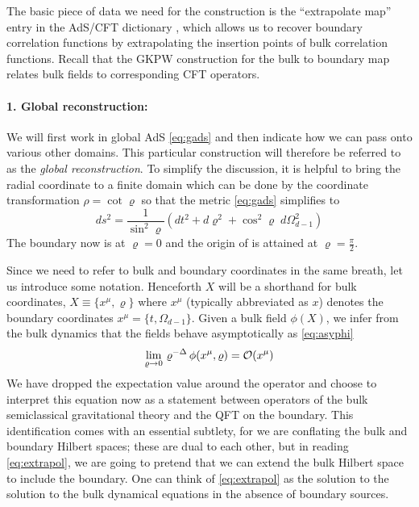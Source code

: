 \documentclass[12pt,openany]{book}
\begin{document}
The basic piece of data we need for the construction is the ``extrapolate map'' entry in the AdS/CFT dictionary \cite{Banks:1998dd,Balasubramanian:1998de,Harlow:2011ke}, which allows us to recover boundary correlation functions by extrapolating the insertion points of bulk correlation functions. Recall that the GKPW construction \cite{Gubser:1998bc,Witten:1998qj} for the bulk to boundary map relates bulk fields to corresponding CFT operators.


\paragraph{1. Global reconstruction:} We will first work in global AdS \eqref{eq:gads} and then indicate how we can pass onto various other domains. This particular construction will therefore be referred to as the \emph{global reconstruction}.  To simplify the discussion, it is helpful to bring the radial coordinate to a finite domain which can be done by the coordinate transformation $\rho = \cot\varrho$ so that the metric \eqref{eq:gads} simplifies to
%
\begin{equation}
ds^2 = \frac{1}{\sin^2 \varrho} \left(dt^2 + d\varrho^2 + \cos^2 \varrho \; d\Omega_{d-1}^2 \right)
\label{eq:gads2}
\end{equation}
%
The boundary now is at $\varrho = 0$ and the origin of  is attained at $\varrho  = \frac{\pi}{2}$.

Since we need to refer to bulk and boundary coordinates in the same breath, let us introduce some notation.
Henceforth $X$ will be a shorthand for bulk coordinates, $X \equiv \{x^\mu, \varrho\}$
where $x^\mu$ (typically abbreviated as $x$) denotes the boundary coordinates $x^\mu = \{ t, \Omega_{d-1}\}$.
Given a bulk field $\phi(X)$,  we infer from the bulk dynamics that the fields behave asymptotically as \eqref{eq:asyphi}
%
\begin{equation}
\lim_{\varrho \to 0} \, \varrho^{-\Delta} \, \phi(x^\mu, \varrho)  = {\cal O}(x^\mu)
\label{eq:extrapol}
\end{equation}
%
We have dropped the expectation value around the operator and choose to interpret this equation now as a statement between operators of the bulk semiclassical gravitational theory and the QFT on the boundary. This identification comes with an essential subtlety, for we are conflating the bulk and boundary Hilbert spaces; these are dual to each other, but in reading \eqref{eq:extrapol}, we are going to pretend that we can extend the bulk Hilbert space to include the  boundary.   One can think of  \eqref{eq:extrapol} as the solution to the solution to the bulk dynamical equations in the absence of boundary sources.
\end{document}
